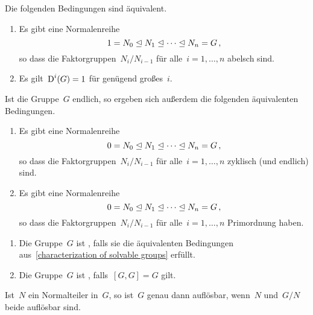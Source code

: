 \begin{proposition}
  \label{characterization of solvable groups}
  Die folgenden Bedingungen sind äquivalent.
  \begin{enumerate}
    \item
      Es gibt eine Normalenreihe
      \[
        1
        =
        N_0
        \trianglelefteq
        N_1
        \trianglelefteq
        \dotsb
        \trianglelefteq
        N_n
        =
        G \,,
      \]
      so dass die Faktorgruppen~$N_i / N_{i-1}$ für alle~$i = 1, \dotsc, n$ abelsch sind.
    \item
      Es gilt~$\operatorname{D}^i(G) = 1$ für genügend großes~$i$.
  \end{enumerate}
  Ist die Gruppe~$G$ endlich, so ergeben sich außerdem die folgenden äquivalenten Bedingungen.
  \begin{enumerate}[resume*]
    \item
      Es gibt eine Normalenreihe
      \[
        0
        =
        N_0
        \trianglelefteq
        N_1
        \trianglelefteq
        \dotsb
        \trianglelefteq
        N_n
        =
        G \,,
      \]
      so dass die Faktorgruppen~$N_i / N_{i-1}$ für alle~$i = 1, \dotsc, n$ zyklisch (und endlich) sind.
    \item
      Es gibt eine Normalenreihe
      \[
        0
        =
        N_0
        \trianglelefteq
        N_1
        \trianglelefteq
        \dotsb
        \trianglelefteq
        N_n
        =
        G \,,
      \]
      so dass die Faktorgruppen~$N_i / N_{i-1}$ für alle~$i = 1, \dotsc, n$ Primordnung haben.
  \end{enumerate}
\end{proposition}

\begin{definition}
  \leavevmode
  \begin{enumerate}
    \item
      Die Gruppe~$G$ ist , falls sie die äquivalenten Bedingungen aus~\cref{characterization of solvable groups} erfüllt.
    \item
      Die Gruppe~$G$ ist , falls~$[G, G] = G$ gilt.
  \end{enumerate}
\end{definition}

\begin{lemma}
  \label{solveable via ses}
  Ist~$N$ ein Normalteiler in~$G$, so ist~$G$ genau dann auflösbar, wenn~$N$ und~$G/N$ beide auflösbar sind.
\end{lemma}

